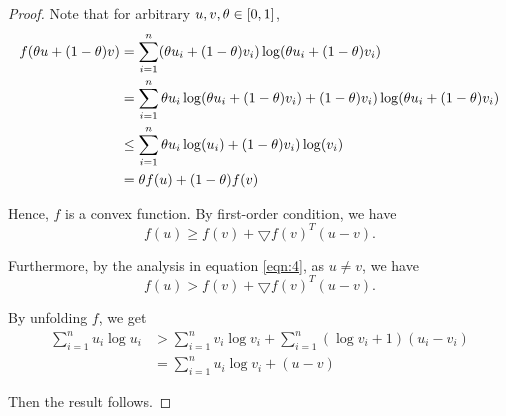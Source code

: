 {\begin{proof}
Note that for arbitrary $u,v,\theta \in \left[0,1\right]$,
\begin{equation}
\begin{aligned}
f(\theta u + (1-\theta)v) &= \sum_{i=1}^{n} (\theta u_i + (1-\theta)v_i) \log (\theta u_i + (1-\theta)v_i) \\
&= \sum_{i=1}^{n} \theta u_i \log (\theta u_i + (1-\theta)v_i) + (1-\theta)v_i) \log (\theta u_i + (1-\theta)v_i) \\
&\leq \sum_{i=1}^{n} \theta u_i \log (u_i) + (1-\theta)v_i) \log (v_i) \\
&= \theta f(u) + (1-\theta )f(v)
\end{aligned}
\label{eqn:4}
\end{equation}

Hence, $f$ is a convex function. By first-order condition, we have
$$ f(u) \geq f(v) + \bigtriangledown f(v)^T(u-v).$$

Furthermore, by the analysis in equation \ref{eqn:4}, as $u \neq v$, we have 
$$ f(u) > f(v) + \bigtriangledown f(v)^T(u-v).$$

By unfolding $f$, we get
\begin{equation}
\begin{aligned} \sum_{i=1}^{n} u_{i} \log u_{i} &>\sum_{i=1}^{n} v_{i} \log v_{i}+\sum_{i=1}^{n}\left(\log v_{i}+1\right)\left(u_{i}-v_{i}\right) \\ &=\sum_{i=1}^{n} u_{i} \log v_{i}+(u-v) \end{aligned}
\end{equation}

Then the result follows.
\end{proof}


}
